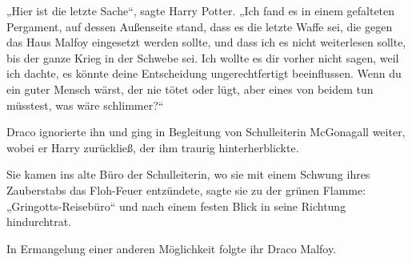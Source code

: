 „Hier ist die letzte Sache“, sagte Harry Potter.
„Ich fand es in einem gefalteten Pergament, auf dessen Außenseite stand, dass es die letzte Waffe sei, die gegen das Haus Malfoy eingesetzt werden sollte, und dass ich es nicht weiterlesen sollte, bis der ganze Krieg in der Schwebe sei. Ich wollte es dir vorher nicht sagen, weil ich dachte, es könnte deine Entscheidung ungerechtfertigt beeinflussen. Wenn du ein guter Mensch wärst, der nie tötet oder lügt, aber eines von beidem tun müsstest, was wäre schlimmer?“

Draco ignorierte ihn und ging in Begleitung von Schulleiterin McGonagall weiter, wobei er Harry zurückließ, der ihm traurig hinterherblickte.

Sie kamen ins alte Büro der Schulleiterin, wo sie mit einem Schwung ihres Zauberstabs das Floh-Feuer entzündete, sagte sie zu der grünen Flamme:
„Gringotts-Reisebüro“ und nach einem festen Blick in seine Richtung hindurchtrat.

In Ermangelung einer anderen Möglichkeit folgte ihr Draco Malfoy.

\later

